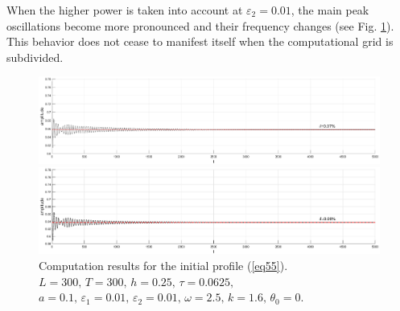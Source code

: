 \documentclass[preprint,12pt]{elsarticle}
\begin{document}
When the higher power is taken into account at \(\varepsilon_{2}=0.01\), the main peak oscillations become more pronounced and their frequency changes (see Fig. \ref{fig48}). This behavior does not cease to manifest itself when the computational grid is subdivided. 
\begin{figure}[H] %
\begin{center}
\begin{minipage}[h]{0.48\linewidth}
\includegraphics[width=1\linewidth]{fig35.eps}
\end{minipage}
\hfill
\begin{minipage}[h]{0.48\linewidth}
\includegraphics[width=1\linewidth]{fig36.eps}
\end{minipage}
\end{center}
\caption{Computation results for the initial profile (\ref{eq55}).\\ 
\(L=300,\, T=300,\, h=0.25,\, \tau=0.0625,\)\\
\(a=0.1,\,\varepsilon_{1}=0.01,\,\varepsilon_{2}=0.01,\, \omega=2.5,\, k=1.6,\, \theta_{0}=0\).}
\label{fig48}
\end{figure}
\end{document}
